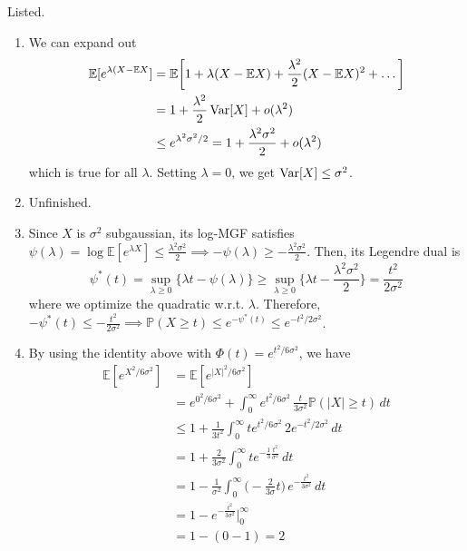  \begin{solution}
  Listed. 
  \begin{enumerate}
      \item We can expand out 
      \begin{align*}
          \mathbb{E}[e^{\lambda (X - \mathbb{E} X}] & = \mathbb{E} \bigg[ 1 + \lambda( X - \mathbb{E}X) + \frac{\lambda^2}{2} (X - \mathbb{E} X)^2 + \ldots \bigg] \\
          & = 1 + \frac{\lambda^2}{2} \operatorname{Var}[X] + o(\lambda^2) \\
          & \leq e^{\lambda^2 \sigma^2 / 2} = 1 + \frac{\lambda^2 \sigma^2}{2} + o (\lambda^2)
      \end{align*}
      which is true for all $\lambda$. Setting $\lambda = 0$, we get $\operatorname{Var}[X] \leq \sigma^2$. 
      
      \item Unfinished. 
      
      \item Since $X$ is $\sigma^2$ subgaussian, its log-MGF satisfies $\psi(\lambda) = \log \mathbb{E}[e^{\lambda X}] \leq \frac{\lambda^2 \sigma^2}{2} \implies - \psi(\lambda) \geq - \frac{\lambda^2 \sigma^2}{2}$. Then, its Legendre dual is 
      \begin{equation}
        \psi^\ast (t) = \sup_{\lambda \geq 0} \{ \lambda t - \psi(\lambda)\} \geq \sup_{\lambda \geq 0} \{ \lambda t - \frac{\lambda^2 \sigma^2}{2} \} = \frac{t^2}{2 \sigma^2}
      \end{equation}
      where we optimize the quadratic w.r.t. $\lambda$. Therefore, $-\psi^* (t) \leq - \frac{t^2}{2\sigma^2} \implies \mathbb{P}(X \geq t) \leq e^{ - \psi^* (t)} \leq e^{- t^2/ 2 \sigma^2}$. 
      
      
      \item By using the identity above with $\Phi(t) = e^{t^2 / 6 \sigma^2}$, we have 
      \begin{align*}
          \mathbb{E}[e^{X^2 / 6 \sigma^2}] & = \mathbb{E}[e^{|X|^2 / 6 \sigma^2}] \\
          & = e^{0^2 / 6 \sigma^2} + \int_0^\infty e^{t^2 / 6 \sigma^2} \, \frac{t}{3 \sigma^2} \mathbb{P}(|X| \geq t) \, dt \\
          & \leq 1 + \frac{1}{3t^2} \int_0^\infty t e^{t^2 / 6 \sigma^2} \, 2 e^{-t^2 / 2\sigma^2} \, dt\\
          & = 1 + \frac{2}{3 \sigma^2} \int_0^\infty t e^{-\frac{1}{3} \frac{t^2}{\sigma^2}} \, dt \\
          & = 1 - \frac{1}{\sigma^2} \int_0^\infty \Big( - \frac{2}{3 \sigma} t \Big) \, e^{- \frac{t^2}{3 \sigma^2}} \, dt \\
          & = 1 - e^{- \frac{t^2}{3 \sigma^2}} \bigg|_0^\infty \\
          & = 1 - (0 - 1) = 2 
      \end{align*}
      

\end{enumerate}
\end{solution}
